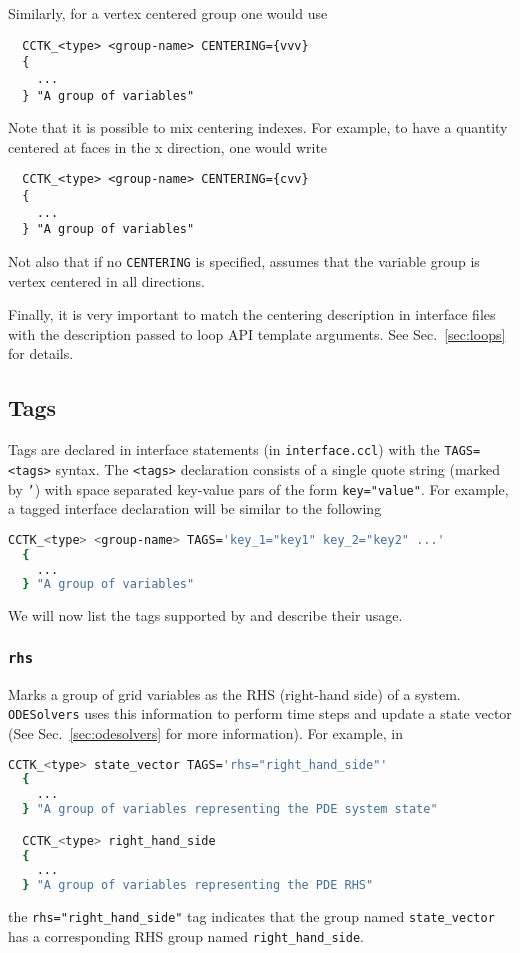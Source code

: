 Similarly, for a vertex centered group one would use
%
\begin{lstlisting}
  CCTK_<type> <group-name> CENTERING={vvv}
  {
    ...
  } "A group of variables"
\end{lstlisting}

Note that it is possible to mix centering indexes. For example, to have a quantity centered at faces in the x direction, one would write
%
\begin{lstlisting}
  CCTK_<type> <group-name> CENTERING={cvv}
  {
    ...
  } "A group of variables"
\end{lstlisting}

Not also that if no \texttt{CENTERING} is specified, \CarpetX\space assumes that the variable group is vertex centered in all directions.

Finally, it is very important to match the centering description in interface files with the description passed to loop API template arguments. See Sec.~\ref{sec:loops} for details.

\subsection{Tags}
\label{sec:tags}

Tags are declared in interface statements (in \texttt{interface.ccl}) with the \texttt{TAGS=<tags>} syntax. The \texttt{<tags>} declaration consists of a single quote string (marked by \texttt{'}) with space separated key-value pars of the form \texttt{key="value"}. For example, a tagged interface declaration will be similar to the following
%
\begin{lstlisting}[language=bash]
  CCTK_<type> <group-name> TAGS='key_1="key1" key_2="key2" ...'
  {
    ...
  } "A group of variables"
\end{lstlisting}

We will now list the tags supported by \CarpetX\space and describe their usage.

\subsubsection{\texttt{rhs}}

Marks a group of grid variables as the RHS (right-hand side) of a system. \texttt{ODESolvers} uses this information to perform time steps and update a state vector (See Sec.~\ref{sec:odesolvers} for more information). For example, in
%
\begin{lstlisting}[language=bash]
  CCTK_<type> state_vector TAGS='rhs="right_hand_side"'
  {
    ...
  } "A group of variables representing the PDE system state"

  CCTK_<type> right_hand_side
  {
    ...
  } "A group of variables representing the PDE RHS"
\end{lstlisting}
%
the \texttt{rhs="right\_hand\_side"} tag indicates that the group named \texttt{state\_vector} has a corresponding RHS group named \texttt{right\_hand\_side}.

